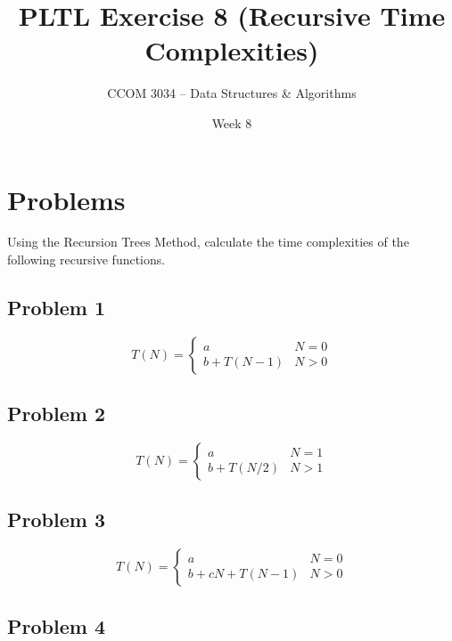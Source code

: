 \documentclass[11 pt]{article}
\title{PLTL Exercise 8 (Recursive Time Complexities)}
\author{CCOM 3034 – Data Structures \& Algorithms}
\date{Week 8}
\begin{document}

\maketitle

\section{Problems}

Using the Recursion Trees Method, calculate the time complexities of the following recursive functions.

\subsection{Problem 1}

\[ 
    T(N) = 
    \begin{cases} 
        a & N = 0 \\
        b + T(N-1) & N > 0
    \end{cases}
\]

\subsection{Problem 2}

\[ 
    T(N) = 
    \begin{cases} 
        a & N = 1 \\
        b + T(N/2) & N > 1
    \end{cases}
\]

\subsection{Problem 3}

\[ 
    T(N) = 
    \begin{cases} 
        a & N = 0 \\
        b + cN + T(N-1) & N > 0
    \end{cases}
\]

\subsection{Problem 4 }
\end{document}
